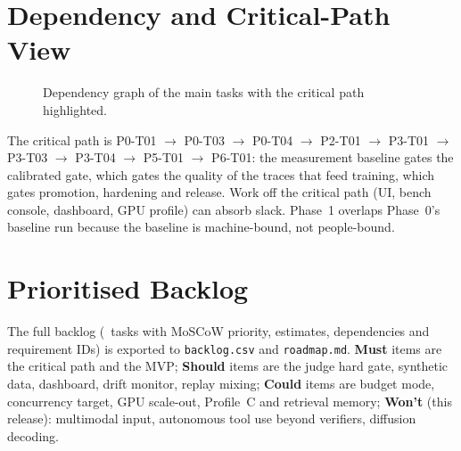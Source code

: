 \documentclass[11pt,a4paper]{article}
\begin{document}
\section{Dependency and Critical-Path View}
\begin{figure}[h]\centering\scalebox{0.86}{}\caption{Dependency graph of the main tasks with the critical path highlighted.}\label{fig:dep}\end{figure}
The critical path is P0-T01 $\to$ P0-T03 $\to$ P0-T04 $\to$ P2-T01 $\to$ P3-T01 $\to$ P3-T03 $\to$ P3-T04 $\to$ P5-T01 $\to$ P6-T01: the measurement baseline gates the calibrated gate, which gates the quality of the traces that feed training, which gates promotion, hardening and release. Work off the critical path (UI, bench console, dashboard, GPU profile) can absorb slack. Phase~1 overlaps Phase~0's baseline run because the baseline is machine-bound, not people-bound.

\section{Prioritised Backlog}
The full backlog (\NTasks\ tasks with MoSCoW priority, estimates, dependencies and requirement IDs) is exported to \texttt{backlog.csv} and \texttt{roadmap.md}. \textbf{Must} items are the critical path and the MVP; \textbf{Should} items are the judge hard gate, synthetic data, dashboard, drift monitor, replay mixing; \textbf{Could} items are budget mode, concurrency target, GPU scale-out, Profile~C and retrieval memory; \textbf{Won't} (this release): multimodal input, autonomous tool use beyond verifiers, diffusion decoding.
\end{document}
